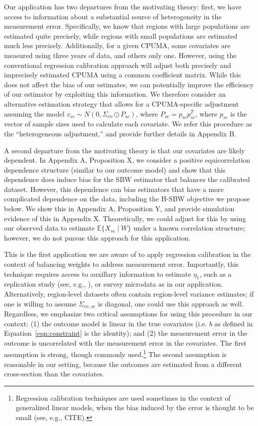 \documentclass[aoas]{imsart}
\theoremstyle{plain}
\theoremstyle{remark}
\begin{document}
Our application has two departures from the motivating theory: first, we have access to information about a substantial source of heterogeneity in the measurement error. Specifically, we know that regions with large populations are estimated quite precisely, while regions with small populations are estimated much less precisely. Additionally, for a given CPUMA, some covariates are measured using three years of data, and others only one. However, using the conventional regression calibration approach will adjust both precisely and imprecisely estimated CPUMA using a common coefficient matrix. While this does not affect the bias of our estimates, we can potentially improve the efficiency of our estimator by exploiting this information. We therefore consider an alternative estimation strategy that allows for a CPUMA-specific adjustment assuming the model $v_{sc} \sim N(0, \Sigma_{vv} \odot P_{sc})$, where $P_{sc} = p_{sc}p_{sc}^T$, where $p_{sc}$ is the vector of sample sizes used to calculate each covariate. We refer this procedure as the ``heterogeneous adjustment,'' and provide further details in Appendix B.

A second departure from the motivating theory is that our covariates are likely dependent. In Appendix A, Proposition X, we consider a positive equicorrelation dependence structure (similar to our outcome model) and show that this dependence does induce bias for the SBW estimator that balances the calibrated dataset. However, this dependence can bias estimators that have a more complicated dependence on the data, including the H-SBW objective we propose below. We show this in Appendix A, Proposition Y, and provide simulation evidence of this in Appendix X. Theoretically, we could adjust for this by using our observed data to estimate $\mathbb{E}\{X_{sc} \mid W\}$ under a known correlation structure; however, we do not pursue this approach for this application. 

This is the first application we are aware of to apply regression calibration in the context of balancing weights to address measurement error. Importantly, this technique requires access to auxillary information to estimate $\eta_1$, such as a replication study (see, e.g., \cite{gleser1992importance}), or survey microdata as in our application. Alternatively, region-level datasets often contain region-level variance estimates; if one is willing to assume $\Sigma_{vv, sc}$ is diagonal, one could use this approach as well. Regardless, we emphasize two critical assumptions for using this procedure in our context: (1) the outcome model is linear in the true covariates (i.e. $b$ as defined in Equation~\ref{eqn:constraint} is the identity); and (2) the measurement error in the outcome is uncorrelated with the measurement error in the covariates. The first assumption is strong, though commonly used.\footnote{Regression calibration techniques are used sometimes in the context of generalized linear models, when the bias induced by the error is thought to be small (see, e.g., CITE).} The second assumption is reasonable in our setting, because the outcomes are estimated from a different cross-section than the covariates. 
\end{document}
